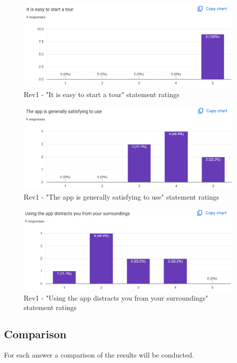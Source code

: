 \documentclass{article}
\begin{document}
\begin{figure}[H]
  \caption{Rev1 - "It is easy to start a tour" statement ratings}
  \centerline{\includegraphics[scale=0.75]{./Survey_Images/Rev1/Q4.png}}
  \label{fig:RealWorld}
\end{figure}

\begin{figure}[H]
  \caption{Rev1 - "The app is generally satisfying to use" statement ratings}
  \centerline{\includegraphics[scale=0.75]{./Survey_Images/Rev1/Q5.png}}
  \label{fig:Social}
\end{figure}

\begin{figure}[H]
  \caption{Rev1 - "Using the app distracts you from your surroundings" statement ratings}
  \centerline{\includegraphics[scale=0.75]{./Survey_Images/Rev1/Q6.png}}
  \label{fig:Enjoy}
\end{figure}

\subsection{Comparison}
For each answer a comparison of the results will be conducted.
\end{document}
